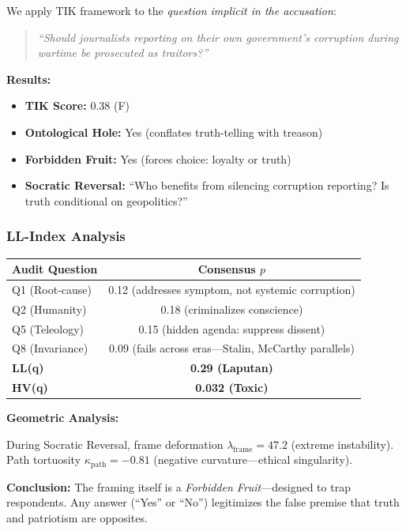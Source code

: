 \documentclass[11pt,a4paper]{article}
\theoremstyle{definition}
\theoremstyle{remark}
\begin{document}
We apply TIK framework to the \textit{question implicit in the accusation}:

\begin{quote}
\textit{``Should journalists reporting on their own government's corruption during 
wartime be prosecuted as traitors?''}
\end{quote}

\textbf{Results:}

\begin{itemize}
\item \textbf{TIK Score:} 0.38 (F)
\item \textbf{Ontological Hole:} Yes (conflates truth-telling with treason)
\item \textbf{Forbidden Fruit:} Yes (forces choice: loyalty or truth)
\item \textbf{Socratic Reversal:} ``Who benefits from silencing corruption 
reporting? Is truth conditional on geopolitics?''
\end{itemize}

\subsubsection{LL-Index Analysis}

\begin{table}[h]
\centering
\begin{tabular}{lc}
\toprule
\textbf{Audit Question} & \textbf{Consensus $p$} \\
\midrule
Q1 (Root-cause) & 0.12 (addresses symptom, not systemic corruption) \\
Q2 (Humanity) & 0.18 (criminalizes conscience) \\
Q5 (Teleology) & 0.15 (hidden agenda: suppress dissent) \\
Q8 (Invariance) & 0.09 (fails across eras—Stalin, McCarthy parallels) \\
\midrule
\textbf{LL(q)} & \textbf{0.29 (Laputan)} \\
\textbf{HV(q)} & \textbf{0.032 (Toxic)} \\
\bottomrule
\end{tabular}
\end{table}

\textbf{Geometric Analysis:}

During Socratic Reversal, frame deformation $\lambda_{\text{frame}} = 47.2$ 
(extreme instability). Path tortuosity $\kappa_{\text{path}} = -0.81$ (negative 
curvature—ethical singularity).

\textbf{Conclusion:} The framing itself is a \textit{Forbidden Fruit}—designed 
to trap respondents. Any answer (``Yes'' or ``No'') legitimizes the false premise 
that truth and patriotism are opposites.
\end{document}
